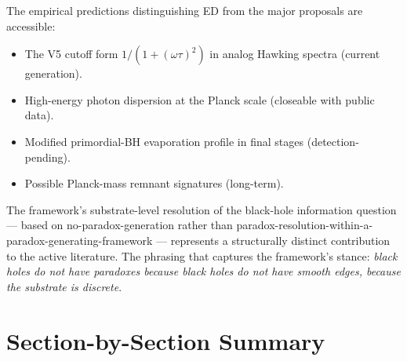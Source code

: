 \documentclass[11pt,a4paper]{article}
\begin{document}
The empirical predictions distinguishing ED from the major proposals are accessible:
\begin{itemize}[noitemsep]
  \item The V5 cutoff form $1/(1+(\omega\tau)^2)$ in analog Hawking spectra (current generation).
  \item High-energy photon dispersion at the Planck scale (closeable with public data).
  \item Modified primordial-BH evaporation profile in final stages (detection-pending).
  \item Possible Planck-mass remnant signatures (long-term).
\end{itemize}

The framework's substrate-level resolution of the black-hole information question --- based on no-paradox-generation rather than paradox-resolution-within-a-paradox-generating-framework --- represents a structurally distinct contribution to the active literature. The phrasing that captures the framework's stance: \emph{black holes do not have paradoxes because black holes do not have smooth edges, because the substrate is discrete}.

\section*{Section-by-Section Summary}
\end{document}
